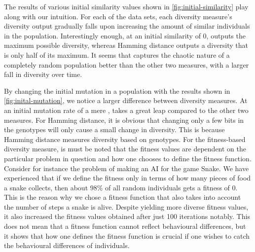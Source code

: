 

The results of various initial similarity values shown in \cref{fig:initial-similarity} play along with our intuition.
For each of the data sets, each diversity measure's diversity output gradually falls upon increasing the amount of similar individuals in the population. Interestingly enough, at an initial similarity of 0, \dia{} outputs the maximum possible diversity, whereas Hamming distance outputs a diversity that is only half of its maximum. It seems that \dia{} captures the chaotic nature of a completely random population better than the other two measures, with a larger fall in diversity over time.



By changing the initial mutation in a population with the results shown in \cref{fig:inital-mutation}, we notice a larger difference between diversity measures. At an initial mutation rate of a mere , \dia{} takes a great leap compared to the other two measures.
For Hamming distance, it is obvious that changing only a few bits in the genotypes will only cause a small change in diversity.
This is because Hamming distance measures diversity based on genotypes.
For the fitness-based diversity measure, is must be noted that the fitness values are dependent on the particular problem in question and how one chooses to define the fitness function.
Consider for instance the problem of making an AI for the game Snake.
We have experienced that if we define the fitness only in terms of how many pieces of food a snake collects,
then about $98 \%$ of all random individuals gets a fitness of $0$.
This is the reason why we chose a fitness function that also takes into account the number of steps a snake is alive.
Despite yielding more diverse fitness values, it also increased the fitness values obtained after just 100 iterations notably.
This does not mean that a fitness function cannot reflect behavioural differences, but it shows that how one defines the fitness function is crucial if one wishes to catch the behavioural differences of individuals.